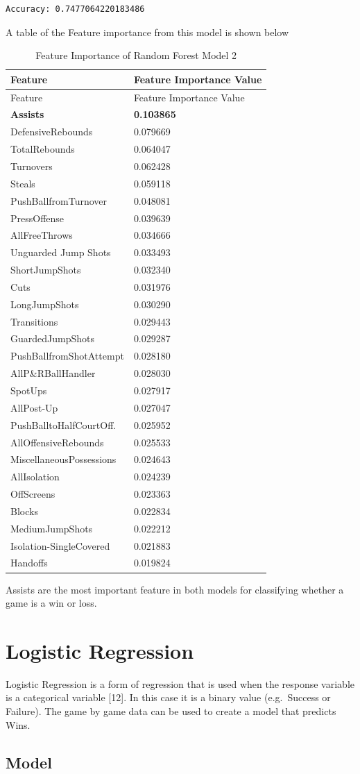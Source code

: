 \documentclass[]{book}
\begin{document}
\begin{verbatim}
Accuracy: 0.7477064220183486
\end{verbatim}

A table of the Feature importance from this model is shown below

\begin{longtable}[]{@{}ll@{}}
\caption{Feature Importance of Random Forest Model 2}\tabularnewline
\toprule
Feature & Feature Importance Value\tabularnewline
\midrule
\endfirsthead
\toprule
Feature & Feature Importance Value\tabularnewline
\midrule
\endhead
\textbf{Assists} & \textbf{0.103865}\tabularnewline
DefensiveRebounds & 0.079669\tabularnewline
TotalRebounds & 0.064047\tabularnewline
Turnovers & 0.062428\tabularnewline
Steals & 0.059118\tabularnewline
PushBallfromTurnover & 0.048081\tabularnewline
PressOffense & 0.039639\tabularnewline
AllFreeThrows & 0.034666\tabularnewline
Unguarded Jump Shots & 0.033493\tabularnewline
ShortJumpShots & 0.032340\tabularnewline
Cuts & 0.031976\tabularnewline
LongJumpShots & 0.030290\tabularnewline
Transitions & 0.029443\tabularnewline
GuardedJumpShots & 0.029287\tabularnewline
PushBallfromShotAttempt & 0.028180\tabularnewline
AllP\&RBallHandler & 0.028030\tabularnewline
SpotUps & 0.027917\tabularnewline
AllPost-Up & 0.027047\tabularnewline
PushBalltoHalfCourtOff. & 0.025952\tabularnewline
AllOffensiveRebounds & 0.025533\tabularnewline
MiscellaneousPossessions & 0.024643\tabularnewline
AllIsolation & 0.024239\tabularnewline
OffScreens & 0.023363\tabularnewline
Blocks & 0.022834\tabularnewline
MediumJumpShots & 0.022212\tabularnewline
Isolation-SingleCovered & 0.021883\tabularnewline
Handoffs & 0.019824\tabularnewline
\bottomrule
\end{longtable}

Assists are the most important feature in both models for classifying whether a game is a win or loss.

\hypertarget{logistic-regression}{%
\section{Logistic Regression}\label{logistic-regression}}

Logistic Regression is a form of regression that is used when the response variable is a categorical variable {[}12{]}. In this case it is a binary value (e.g.~Success or Failure). The game by game data can be used to create a model that predicts Wins.

\hypertarget{model}{%
\subsection{Model}\label{model}}
\end{document}
